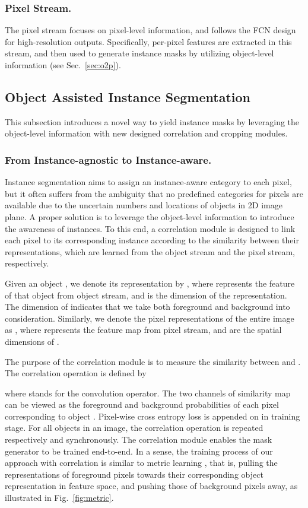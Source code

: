 \documentclass[letterpaper]{article} \usepackage{aaai20}  \usepackage{times}  \usepackage{helvet} \usepackage{courier}  \usepackage[hyphens]{url}  \usepackage{graphicx} \urlstyle{rm} \def\UrlFont{\rm}  \usepackage{graphicx}  \frenchspacing  \setlength{\pdfpagewidth}{8.5in}  \setlength{\pdfpageheight}{11in}
\begin{document}
\subsubsection{Pixel Stream.}
The pixel stream focuses on pixel-level information, and follows the FCN  design for high-resolution outputs. Specifically, per-pixel features are extracted in this stream, and then used to generate instance masks by utilizing object-level information (see Sec.~\ref{sec:o2p}). 


\subsection{Object Assisted Instance Segmentation\label{sec:o2p}}
This subsection introduces a novel way to yield instance masks by leveraging the object-level information with new designed correlation and cropping modules.

\subsubsection{From Instance-agnostic to Instance-aware.}
Instance segmentation aims to assign an instance-aware category to each pixel, but it often suffers from the ambiguity that no predefined categories for pixels are available due to the uncertain numbers and locations of objects in 2D image plane. A proper solution is to leverage the object-level information to introduce the awareness of instances. To this end, a correlation module is designed to link each pixel to its corresponding instance according to the similarity between their representations, which are learned from the object stream and the pixel stream, respectively.

Given an object , we denote its representation by , where  represents the feature of that object from object stream, and  is the dimension of the representation. The  dimension of  indicates that we take both foreground and background into consideration. Similarly, we denote the pixel representations of the entire image as , where  represents the feature map from pixel stream,  and  are the spatial dimensions of .

The purpose of the correlation module is to measure the similarity between  and . The correlation operation is defined by 

where  stands for the convolution operator. The two channels of similarity map  can be viewed as the foreground and background probabilities of each pixel corresponding to object . Pixel-wise cross entropy loss is appended on  in training stage. For all objects in an image, the correlation operation is repeated respectively and synchronously. The correlation module enables the mask generator to be trained end-to-end. In a sense, the training process of our approach with correlation is similar to metric learning \cite{fathi2017semantic}, that is, pulling the representations of foreground pixels towards their corresponding object representation in feature space, and pushing those of background pixels away, as illustrated in Fig.~\ref{fig:metric}.
\end{document}
